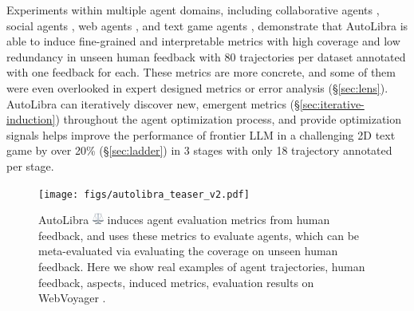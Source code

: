 \documentclass[../main.tex]{subfiles}
\begin{document}
\noindent Experiments within multiple agent domains, including collaborative agents \citep{shao2024collaborative},
social agents \citep{zhousotopia}, web agents \citep{zhouwebarena,he2024webvoyager},
and text game agents \citep{paglieri2024balrog,cloos2024babaaibreakrules}, demonstrate
that AutoLibra is able to induce fine-grained and interpretable metrics with high
coverage and low redundancy in unseen human feedback with 80 trajectories per dataset
annotated with one feedback for each. These metrics are more concrete, and some of
them were even overlooked in expert designed metrics or error analysis (\S\ref{sec:lens}).
AutoLibra can iteratively discover new, emergent metrics (\S\ref{sec:iterative-induction})
throughout the agent optimization process, and provide optimization signals
helps improve the performance of frontier LLM in a challenging 2D text game by
over 20\% (\S\ref{sec:ladder}) in 3 stages with only 18 trajectory annotated per
stage.

%

\begin{figure}[p]
	\centering
	\texttt{[image: figs/autolibra\_teaser\_v2.pdf]}
	\caption{AutoLibra \protect
	\includegraphics[height=1em]{figs/scale.png}
	induces agent evaluation metrics from human feedback, and uses these metrics to
	evaluate agents, which can be meta-evaluated via evaluating the coverage on
	unseen human feedback. Here we show real examples of agent trajectories, human
	feedback, aspects, induced metrics, evaluation results on WebVoyager \citep{he2024webvoyager}.
	\vspace{-20pt}
	}
	\label{fig:teaser}
\end{figure}
\end{document}

